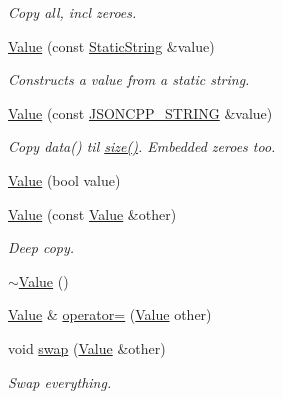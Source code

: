 \begin{DoxyCompactItemize}
\begin{DoxyCompactList}\small\item\em Copy all, incl zeroes. \end{DoxyCompactList}\item 
\hyperlink{classJson_1_1Value_a081830e95f88a37054da7e46c65b0766_a081830e95f88a37054da7e46c65b0766}{Value} (const \hyperlink{classJson_1_1StaticString}{Static\+String} \&value)
\begin{DoxyCompactList}\small\item\em Constructs a value from a static string. \end{DoxyCompactList}\item 
\hyperlink{classJson_1_1Value_a89ef37969ff7c6eb3a7afcca03d4cd4a_a89ef37969ff7c6eb3a7afcca03d4cd4a}{Value} (const \hyperlink{json_8h_a1e723f95759de062585bc4a8fd3fa4be_a1e723f95759de062585bc4a8fd3fa4be}{J\+S\+O\+N\+C\+P\+P\+\_\+\+S\+T\+R\+I\+NG} \&value)
\begin{DoxyCompactList}\small\item\em Copy data() til \hyperlink{classJson_1_1Value_a0ec2808e1d7efa4e9fad938d6667be44_a0ec2808e1d7efa4e9fad938d6667be44}{size()}. Embedded zeroes too. \end{DoxyCompactList}\item 
\hyperlink{classJson_1_1Value_a350a31ea4a30d384994b0bc010b17495_a350a31ea4a30d384994b0bc010b17495}{Value} (bool value)
\item 
\hyperlink{classJson_1_1Value_a436dfd3670f95fd665f680eba5cebcf0_a436dfd3670f95fd665f680eba5cebcf0}{Value} (const \hyperlink{classJson_1_1Value}{Value} \&other)
\begin{DoxyCompactList}\small\item\em Deep copy. \end{DoxyCompactList}\item 
\hyperlink{classJson_1_1Value_a287dea48da3912d02756735bf677b27b_a287dea48da3912d02756735bf677b27b}{$\sim$\+Value} ()
\item 
\hyperlink{classJson_1_1Value}{Value} \& \hyperlink{classJson_1_1Value_a795acb28772da4c5d85ae8f4af36c69f_a795acb28772da4c5d85ae8f4af36c69f}{operator=} (\hyperlink{classJson_1_1Value}{Value} other)
\item 
void \hyperlink{classJson_1_1Value_aab841120d78e296e1bc06a373345e822_aab841120d78e296e1bc06a373345e822}{swap} (\hyperlink{classJson_1_1Value}{Value} \&other)
\begin{DoxyCompactList}\small\item\em Swap everything. \end{DoxyCompactList}\item 

\end{DoxyCompactItemize}
